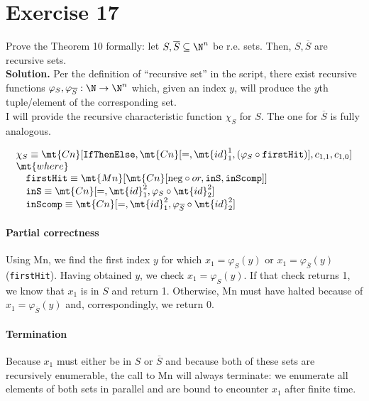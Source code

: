 \section{Exercise 17}

Prove the Theorem 10 formally: let $S, \overline{S} \subseteq \N^n$ be r.e. sets. Then, $S, \overline{S}$ are recursive sets.\\

\noindent
\textbf{Solution.} Per the definition of ``recursive set'' in the script, there exist recursive functions $\varphi_S, \varphi_{\overline{S}} : \N \rightarrow \N^n$ which, given an index $y$, will produce the $y$th tuple/element of the corresponding set.\\

\noindent
I will provide the recursive characteristic function $\chi_S$ for $S$. The one for $\overline{S}$ is fully analogous.

$$
	\begin{array}{l}
	\chi_S \equiv \mt{Cn}[\texttt{IfThenElse}, \mt{Cn}[=, \mt{id}^1_1, (\varphi_S \circ \texttt{firstHit})], c_{1,1}, c_{1,0} ]\\
	\mt{where}\\
	\quad \texttt{firstHit} \equiv \mt{Mn}[ \mt{Cn}[\text{neg} \circ or, \texttt{inS}, \texttt{inScomp}]]\\
	\quad \texttt{inS} \equiv \mt{Cn}[=, \mt{id}^2_1, \varphi_S \circ \mt{id}^2_2]\\
	\quad \texttt{inScomp} \equiv \mt{Cn}[=, \mt{id}^2_1, \varphi_{\overline{S}} \circ \mt{id}^2_2]\\
	\end{array}
$$

\noindent
\paragraph{Partial correctness} Using Mn, we find the first index $y$ for which $x_1 = \varphi_S(y)$ or $x_1 = \varphi_{\overline{S}}(y)$ (\texttt{firstHit}). Having obtained $y$, we check $x_1 = \varphi_S(y)$. If that check returns 1, we know that $x_1$ is in $S$ and return 1. Otherwise, Mn must have halted because of $x_1 = \varphi_{\overline{S}}(y)$ and, correspondingly, we return 0.

\paragraph{Termination} Because $x_1$ must either be in $S$ or $\overline{S}$ and because both of these sets are recursively enumerable, the call to Mn will always terminate: we enumerate all elements of both sets in parallel and are bound to encounter $x_1$ after finite time.

